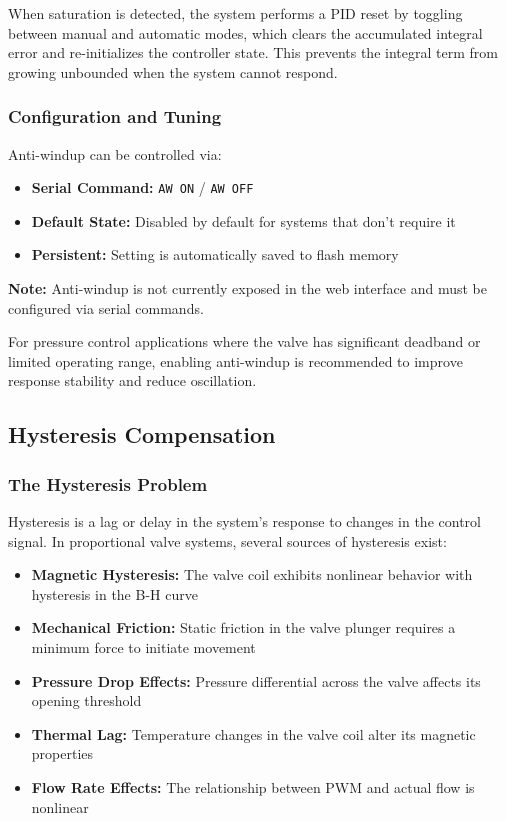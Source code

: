 When saturation is detected, the system performs a PID reset by toggling between manual and automatic modes, which clears the accumulated integral error and re-initializes the controller state. This prevents the integral term from growing unbounded when the system cannot respond.

\subsubsection{Configuration and Tuning}
Anti-windup can be controlled via:

\begin{itemize}
    \item \textbf{Serial Command:} \texttt{AW ON} / \texttt{AW OFF}
    \item \textbf{Default State:} Disabled by default for systems that don't require it
    \item \textbf{Persistent:} Setting is automatically saved to flash memory
\end{itemize}

\textbf{Note:} Anti-windup is not currently exposed in the web interface and must be configured via serial commands.

For pressure control applications where the valve has significant deadband or limited operating range, enabling anti-windup is recommended to improve response stability and reduce oscillation.

\subsection{Hysteresis Compensation}
\label{sec:hysteresis}

\subsubsection{The Hysteresis Problem}
Hysteresis is a lag or delay in the system's response to changes in the control signal. In proportional valve systems, several sources of hysteresis exist:

\begin{itemize}
    \item \textbf{Magnetic Hysteresis:} The valve coil exhibits nonlinear behavior with hysteresis in the B-H curve
    \item \textbf{Mechanical Friction:} Static friction in the valve plunger requires a minimum force to initiate movement
    \item \textbf{Pressure Drop Effects:} Pressure differential across the valve affects its opening threshold
    \item \textbf{Thermal Lag:} Temperature changes in the valve coil alter its magnetic properties
    \item \textbf{Flow Rate Effects:} The relationship between PWM and actual flow is nonlinear
\end{itemize}


